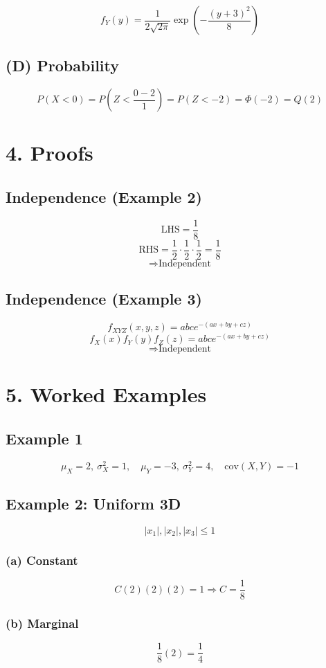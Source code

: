 \documentclass[12pt]{article}
\begin{document}
\[
f_Y(y)=\frac{1}{2\sqrt{2\pi}} \exp\left(-\frac{(y+3)^2}{8}\right)
\]

\subsection*{(D) Probability}
\[
P(X<0)=P\left(Z<\frac{0-2}{1}\right)=P(Z<-2)=\Phi(-2)=Q(2)
\]

\section*{4. Proofs}

\subsection*{Independence (Example 2)}
\[
\text{LHS}=\frac{1}{8}
\]
\[
\text{RHS}=\frac{1}{2}\cdot\frac{1}{2}\cdot\frac{1}{2}=\frac{1}{8}
\]
\[
\Rightarrow \text{Independent}
\]

\subsection*{Independence (Example 3)}
\[
f_{XYZ}(x,y,z)=abce^{-(ax+by+cz)}
\]
\[
f_X(x)f_Y(y)f_Z(z)=abce^{-(ax+by+cz)}
\]
\[
\Rightarrow \text{Independent}
\]

\section*{5. Worked Examples}

\subsection*{Example 1}
\[
\mu_X=2,\ \sigma_X^2=1,\quad
\mu_Y=-3,\ \sigma_Y^2=4,\quad
\text{cov}(X,Y)=-1
\]

\subsection*{Example 2: Uniform 3D}

\[
|x_1|,|x_2|,|x_3|\le1
\]

\subsubsection*{(a) Constant}
\[
C(2)(2)(2)=1 \Rightarrow C=\frac{1}{8}
\]

\subsubsection*{(b) Marginal}
\[
\frac{1}{8}(2)=\frac{1}{4}
\]
\end{document}
